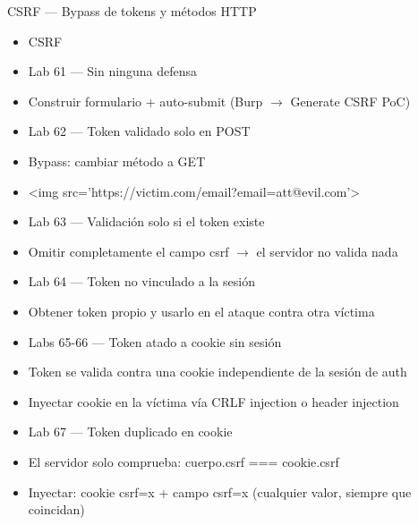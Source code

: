 \documentclass[aspectratio=169,10pt]{beamer}
\newcommand{\cmdbox}[1]{%
  \begin{center}%
  {\setlength{\fboxsep}{6pt}\colorbox{uzlav!40}{\parbox{0.88\linewidth}{\ttfamily\footnotesize #1}}}%
  \end{center}}
\begin{document}
\begin{frame}[allowframebreaks]{CSRF --- Bypass de tokens y métodos HTTP}
\small
  \begin{itemize}
  \item CSRF
  \item Lab 61 --- Sin ninguna defensa
  \item Construir formulario + auto-submit (Burp $\rightarrow$ Generate CSRF PoC)
  \item Lab 62 --- Token validado solo en POST
  \item Bypass: cambiar método a GET
  \item[] \cmdbox{\textless{}img src='https://victim.com/email?email=att@evil.com'\textgreater{}}
  \item Lab 63 --- Validación solo si el token existe
  \item Omitir completamente el campo csrf $\rightarrow$ el servidor no valida nada
  \item Lab 64 --- Token no vinculado a la sesión
  \item Obtener token propio y usarlo en el ataque contra otra víctima
  \item Labs 65-66 --- Token atado a cookie sin sesión
  \item Token se valida contra una cookie independiente de la sesión de auth
  \item Inyectar cookie en la víctima vía CRLF injection o header injection
  \item Lab 67 --- Token duplicado en cookie
  \item El servidor solo comprueba: cuerpo.csrf === cookie.csrf
  \item Inyectar: cookie csrf=x + campo csrf=x (cualquier valor, siempre que coincidan)
  \end{itemize}
\end{frame}
\end{document}
